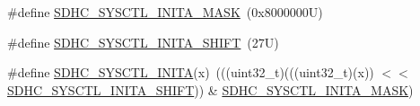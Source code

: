 \begin{DoxyCompactItemize}
\#define \mbox{\hyperlink{group___s_d_h_c___register___masks_ga2a115ba3d13885e273f8113ee502beb3}{S\+D\+H\+C\+\_\+\+S\+Y\+S\+C\+T\+L\+\_\+\+I\+N\+I\+T\+A\+\_\+\+M\+A\+SK}}~(0x8000000\+U)
\item 
\#define \mbox{\hyperlink{group___s_d_h_c___register___masks_ga2567891a05c79b0dc5fe49160972a448}{S\+D\+H\+C\+\_\+\+S\+Y\+S\+C\+T\+L\+\_\+\+I\+N\+I\+T\+A\+\_\+\+S\+H\+I\+FT}}~(27\+U)
\item 
\#define \mbox{\hyperlink{group___s_d_h_c___register___masks_ga93f847ff52063993fe3193acd8e9aecb}{S\+D\+H\+C\+\_\+\+S\+Y\+S\+C\+T\+L\+\_\+\+I\+N\+I\+TA}}(x)~(((uint32\+\_\+t)(((uint32\+\_\+t)(x)) $<$$<$ \mbox{\hyperlink{group___s_d_h_c___register___masks_ga2567891a05c79b0dc5fe49160972a448}{S\+D\+H\+C\+\_\+\+S\+Y\+S\+C\+T\+L\+\_\+\+I\+N\+I\+T\+A\+\_\+\+S\+H\+I\+FT}})) \& \mbox{\hyperlink{group___s_d_h_c___register___masks_ga2a115ba3d13885e273f8113ee502beb3}{S\+D\+H\+C\+\_\+\+S\+Y\+S\+C\+T\+L\+\_\+\+I\+N\+I\+T\+A\+\_\+\+M\+A\+SK}})
\end{DoxyCompactItemize}
